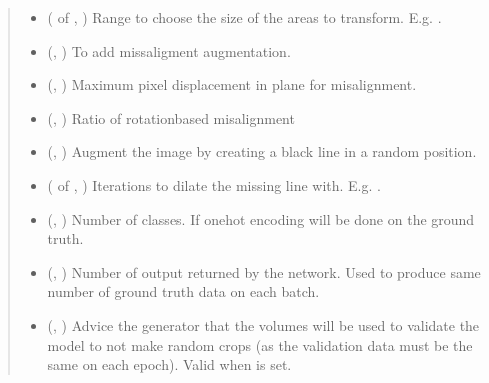 \documentclass[letterpaper,10pt,english]{sphinxmanual}
\begin{document}
\begin{fulllineitems}
\begin{quote}
\begin{description}
\begin{itemize}
\item {} 
 ( of , ) \textendash{} Range to choose the size of the areas to transform. E.g. .

\item {} 
 (, ) \textendash{} To add miss\sphinxhyphen{}aligment augmentation.

\item {} 
 (, ) \textendash{} Maximum pixel displacement in \sphinxhyphen{}plane for misalignment.

\item {} 
 (, ) \textendash{} Ratio of rotation\sphinxhyphen{}based mis\sphinxhyphen{}alignment

\item {} 
 (, ) \textendash{} Augment the image by creating a black line in a random position.

\item {} 
 ( of , ) \textendash{} Iterations to dilate the missing line with. E.g. .

\item {} 
 (, ) \textendash{} Number of classes. If  one\sphinxhyphen{}hot encoding will be done on the ground truth.

\item {} 
 (, ) \textendash{} Number of output returned by the network. Used to produce same number of ground truth data on each batch.

\item {} 
 (, ) \textendash{} Advice the generator that the volumes will be used to validate the model to not make random crops (as the
validation data must be the same on each epoch). Valid when 
is set.


\end{itemize}
\end{description}
\end{quote}
\end{fulllineitems}
\end{document}
